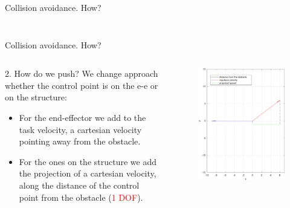 \documentclass[11pt]{beamer}
\begin{document}
\begin{frame}{Collision avoidance. How?}
\begin{columns}
\begin{column}{.5\textwidth}
\begin{figure}[H]
\end{figure}
\end{column}
\end{columns}
\end{frame}

\begin{frame}{Collision avoidance. How?}
	\begin{columns}
		\begin{column}{.5\textwidth}
			\begin{block}{2. How do we push?}
			We change approach whether the control point is on the e-e or on the structure:
				\begin{itemize}
				\item For the end-effector we add to the task velocity, a cartesian velocity pointing away from the obstacle.
				\item For the ones on the structure we add the projection of a cartesian velocity, along the distance of the control point from the obstacle (\textcolor{red}{1 DOF}).
				\end{itemize}
			\end{block}
		\end{column}
		\begin{column}{.5\textwidth}
			\begin{figure}[H]
				\includegraphics[width = .7\textwidth]{images/repulsive_velocity_vectorial.pdf}
			\end{figure}
		\end{column}
	\end{columns}
\end{frame}
\end{document}
